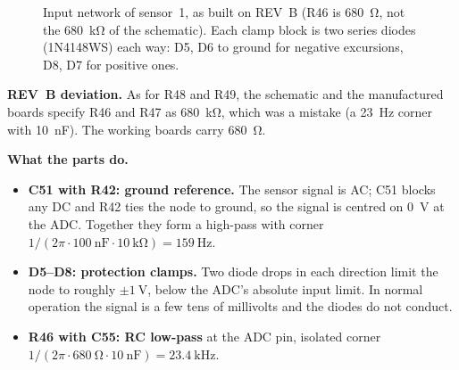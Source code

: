 \documentclass[11pt,a4paper]{article}
\newcommand{\hres}[4]{%
  \node[draw,fill=white,minimum width=0.9cm,minimum height=0.3cm,inner sep=0] (#3) at (#1,#2) {};
  \node[font=\scriptsize,above=1pt of #3] {#4};}
\newcommand{\vres}[4]{%
  \node[draw,fill=white,minimum width=0.3cm,minimum height=0.9cm,inner sep=0] (#3) at (#1,#2) {};
  \node[font=\scriptsize,right=2pt of #3] {#4};}
\newcommand{\hcap}[3]{%
  \draw[thick] (#1-0.06,#2-0.3)--(#1-0.06,#2+0.3);
  \draw[thick] (#1+0.06,#2-0.3)--(#1+0.06,#2+0.3);
  \node[font=\scriptsize,above=4pt] at (#1,#2+0.3) {#3};}
\newcommand{\vcap}[4]{%
  \draw[thick] (#1-0.3,#2-0.06)--(#1+0.3,#2-0.06);
  \draw[thick] (#1-0.3,#2+0.06)--(#1+0.3,#2+0.06);
  \node[font=\scriptsize,right=6pt] at (#1+0.3,#2) {#4};}
\newcommand{\dotnode}[2]{\fill (#1,#2) circle (1.5pt);}
\begin{document}
\begin{figure}[ht]
\centering
{}
\caption{Input network of sensor~1, as built on REV~B (R46 is
         \SI{680}{\ohm}, not the \SI{680}{\kilo\ohm} of the schematic).  Each
         clamp block is two series diodes (1N4148WS) each way: D5, D6 to
         ground for negative excursions, D8, D7 for positive ones.}
\label{fig:sinput}
\end{figure}

\textbf{REV~B deviation.}  As for R48 and R49, the schematic and the
manufactured boards specify R46 and R47 as \SI{680}{\kilo\ohm}, which was a
mistake (a \SI{23}{\hertz} corner with \SI{10}{\nano\farad}).  The working
boards carry \SI{680}{\ohm}.

\textbf{What the parts do.}
\begin{itemize}
  \item \textbf{C51 with R42: ground reference.}  The sensor signal is AC;
        C51 blocks any DC and R42 ties the node to ground, so the signal is
        centred on \SI{0}{\volt} at the ADC.  Together they form a high-pass
        with corner $1/(2\pi\cdot\SI{100}{\nano\farad}\cdot\SI{10}{\kilo\ohm})
        = \SI{159}{\hertz}$.
  \item \textbf{D5--D8: protection clamps.}  Two diode drops in each
        direction limit the node to roughly $\pm\SI{1}{\volt}$, below the
        ADC's absolute input limit.  In normal operation the signal is a few
        tens of millivolts and the diodes do not conduct.
  \item \textbf{R46 with C55: RC low-pass} at the ADC pin, isolated corner
        $1/(2\pi\cdot\SI{680}{\ohm}\cdot\SI{10}{\nano\farad})
        = \SI{23.4}{\kilo\hertz}$.
\end{itemize}
\end{document}
